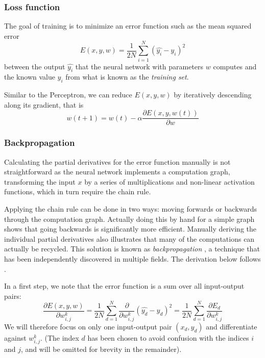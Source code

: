\documentclass[paper=6.14in:9.21in,pagesize=pdftex,11pt,twoside,openright]{scrbook}
\begin{document}
\subsubsection{Loss function}
The goal of training is to minimize an error function such as the mean squared error 
\begin{equation}
E(x,y,w)=\frac{1}{2N}\sum_{i=1}^{N}(\hat{y_i}-y_i)^2
\end{equation}
between the output $\hat{y_i}$ that the neural network with parameters $w$ computes and the known value $y_i$ from what is known as the \emph{training set}. 

Similar to the Perceptron, we can reduce $E(x,y,w)$ by iteratively descending along its gradient, that is
\begin{equation}
w(t+1)=w(t)-\alpha \frac{\partial E(x,y,w(t))}{\partial w}
\end{equation}

\subsubsection{Backpropagation}
Calculating the partial derivatives for the error function manually is not straightforward as the neural network implements a computation graph, transforming the input $x$ by a series of multiplications and non-linear activation functions, which in turn require the chain rule. 

Applying the chain rule can be done in two ways: moving forwards or backwards through the computation graph. Actually doing this by hand for a simple graph shows that going backwards is significantly more efficient. Manually deriving the individual partial derivatives also illustrates that many of the computations can actually be recycled. This solution is known as \emph{backpropagation} \cite{rumelhart1985learning}, a technique that has been independently discovered in multiple fields. The derivation below follows \cite{backpropagation}.

In a first step, we note that the error function is a sum over all input-output pairs:
\begin{equation}
\frac{\partial E(x,y,w)}{\partial w_{i,j}^k}=\frac{1}{2N}\sum^N_{d=1}\frac{\partial}{\partial w_{i,j}^k}(\hat{y_d}-y_d)^2=\frac{1}{2N}\sum_{d=1}^N\frac{\partial E_d}{\partial w_{i,j}^k}
\end{equation}
We will therefore focus on only one input-output pair $(x_d,y_d)$ and differentiate against $w_{i,j}^k$. (The index $d$ has been chosen to avoid confusion with the indices $i$ and $j$, and will be omitted for brevity in the remainder).
\end{document}
